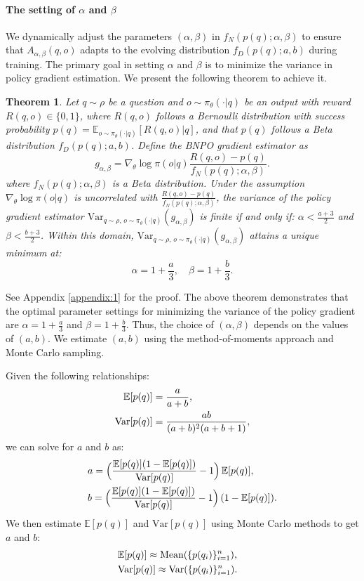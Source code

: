 \documentclass{article}
\theoremstyle{plain}
\newtheorem{theorem}{Theorem}
\theoremstyle{definition}
\theoremstyle{remark}
\begin{document}
\paragraph{The setting of $\alpha$ and $\beta$}
We dynamically adjust the parameters $(\alpha,\beta)$ in $f_{N}(p(q);\alpha,\beta)$ to ensure that $A_{\alpha, \beta}(q,o)$ adapts to the evolving distribution $f_{D}(p(q);a,b)$ during training. The primary goal in setting $\alpha$ and $\beta$ is to minimize the variance in policy gradient estimation. We present the following theorem to achieve it.
\begin{theorem}
\label{theorem:1}
Let \( q \sim \rho \) be a question and \( o \sim \pi_\theta(\cdot | q) \) be an output with reward \( R(q, o) \in \{0, 1\} \), where $R(q,o)$ follows a Bernoulli distribution with success probability \( p(q) = \mathbb{E}_{o\sim\pi_\theta(\cdot| q)}[R(q, o) | q] \), and that $p(q)$ follows a Beta distribution $f_{D}(p(q);a,b) $. Define the BNPO gradient estimator as
\[
g_{\alpha,\beta} = \nabla_\theta \log \pi(o | q) \frac{R(q,o)-p(q)}{f_{N}(p(q);\alpha,\beta)}.
\]
where $f_{N}(p(q);\alpha,\beta)$ is a Beta distribution. Under the assumption $\nabla_\theta \log \pi(o | q)$ is uncorrelated with $\frac{R(q,o)-p(q)}{f_{N}(p(q);\alpha,\beta)}$, the variance of the policy gradient estimator $\mathrm{Var}_{q\sim\rho,\, o\sim\pi_\theta(\cdot| q)}(g_{\alpha,\beta})$ is finite if and only if: \( \alpha < \frac{a + 3}{2} \) and \( \beta < \frac{b + 3}{2} \). Within this domain, $\mathrm{Var}_{q\sim\rho,\, o\sim\pi_\theta(\cdot| q)}(g_{\alpha,\beta})$ attains a unique minimum at:
\[
\alpha = 1 + \frac{a}{3}, \quad \beta = 1 + \frac{b}{3}.
\]
\end{theorem}
See Appendix \ref{appendix:1} for the proof. The above theorem demonstrates that the optimal parameter settings for minimizing the variance of the policy gradient are $\alpha = 1 + \frac{a}{3}$ and $\beta = 1 + \frac{b}{3}$. Thus, the choice of $(\alpha, \beta)$ depends on the values of $(a, b)$. We estimate $(a, b)$ using the method-of-moments approach and Monte Carlo sampling.

Given the following relationships:
\begin{align}
    \mathbb{E}[p(q)]&=\frac{a}{a+b},\notag\\
    \mathrm{Var}[p(q)]&=\frac{ab}{(a+b)^2(a+b+1)},
\end{align}
we can solve for $a$ and $b$ as:
\begin{align}
\label{equation:13}
&a = \Bigl(\frac{ \mathbb{E}[p(q)](1- \mathbb{E}[p(q)])}{\mathrm{Var}[p(q)]}-1\Bigr)\, \mathbb{E}[p(q)],\notag\\
&b = \Bigl(\frac{ \mathbb{E}[p(q)](1- \mathbb{E}[p(q)])}{\mathrm{Var}[p(q)]}-1\Bigr)\,(1- \mathbb{E}[p(q)]).
\end{align}
We then estimate $\mathbb{E}[p(q)]$ and $\mathrm{Var}[p(q)]$ using Monte Carlo methods to get $a$ and $b$:
\begin{align}
\label{equation:14}
    &\mathbb{E}[p(q)]\approx \text{Mean}(\{p(q_{i})\}_{i=1}^{n}),\quad \notag\\
&\mathrm{Var}[p(q)]\approx \text{Var}(\{p(q_{i})\}_{i=1}^{n}).
\end{align}
\end{document}

